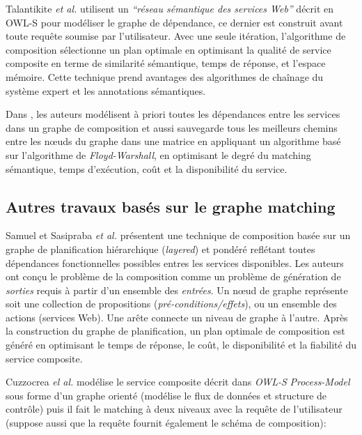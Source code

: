   Talantikite \textit{et al.} \cite{talantikite2009semantic} utilisent
  un \emph{``réseau sémantique des services Web''} décrit en
  \textsc{OWL-S} pour modéliser le graphe de dépendance, ce dernier
  est construit avant toute requête soumise par l'utilisateur. Avec
  une seule itération, l'algorithme de composition sélectionne un plan
  optimale en optimisant la qualité de service composite en terme de
  similarité sémantique, temps de réponse, et l'espace mémoire.
  Cette technique prend avantages des algorithmes de chaînage du
  système expert et les annotations sémantiques.\bigskip

  Dans \cite{elmaghraoui2011graph}, les auteurs modélisent à priori
  toutes les dépendances entre les services dans un graphe de
  composition et aussi sauvegarde tous les meilleurs chemins entre les
  nœuds du graphe dans une matrice en appliquant un algorithme basé
  sur l'algorithme de \textit{Floyd-Warshall}, en optimisant le degré
  du matching sémantique, temps d'exécution, coût et la disponibilité
  du service.

  \subsection{Autres travaux basés sur le graphe matching}
  \label{sec:autres-travaux}
  Samuel et Sasipraba \textit{et al.} \cite{samuel2011approach}
  présentent une technique de composition basée sur un graphe de
  planification hiérarchique (\textit{layered}) et pondéré reflétant
  toutes dépendances fonctionnelles possibles entres les services
  disponibles. Les auteurs ont conçu le problème de la composition
  comme un problème de génération de \textit{sorties} requis à partir
  d'un ensemble des \textit{entrées}. Un nœud de graphe représente
  soit une collection de propositions
  (\textit{pré-conditions/effets}), ou un ensemble des actions
  (services Web). Une arête connecte un niveau de graphe à l'autre.
  Après la construction du graphe de planification, un plan optimale
  de composition est généré en optimisant le temps de réponse, le
  coût, le disponibilité et la fiabilité du service composite.\bigskip

  Cuzzocrea \emph{el al.} \cite{cuzzocrea2011flexible} modélise le
  service composite décrit dans \textit{OWL-S} \textit{Process-Model}
  sous forme d'un graphe orienté (modélise le flux de données et
  structure de contrôle) puis il fait le matching à deux niveaux avec
  la requête de l'utilisateur (suppose aussi que la requête fournit
  également le schéma de composition):

